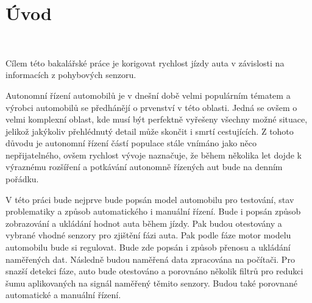 \chapter*{Úvod}
\label{sec:Introduction}
\

Cílem této bakalářské práce je korigovat rychlost jízdy auta v závislosti na informacích
z pohybových senzoru.

Autonomní řízení automobilů je v dnešní době velmi populárním tématem a výrobci automobilů
se předhánějí o prvenství v této oblasti. Jedná se ovšem o velmi komplexní oblast, kde
musí být perfektně vyřešeny všechny možné situace, jelikož jakýkoliv přehlédnutý detail může
skončit i smrtí cestujících. Z tohoto důvodu je autonomní řízení částí populace stále vnímáno jako něco 
nepřijatelného, ovšem rychlost vývoje naznačuje, že během několika let dojde k výraznému rozšíření a 
potkávání autonomně řízených aut bude na denním pořádku.

V této práci bude nejprve bude popsán model automobilu pro testování, stav problematiky a
způsob automatického i manuální řízení. Bude i popsán způsob zobrazování a ukládání hodnot auta během 
jízdy. Pak budou otestovány a vybrané vhodné senzory pro zjištění fázi auta.
Pak podle fáze motor modelu automobilu bude si regulovat.
Bude zde popsán i způsob přenosu a ukládání naměřených dat.
Následně budou naměřená data zpracována na počítači.
Pro snazší detekci fáze, auto bude otestováno a porovnáno několik filtrů
pro redukci šumu aplikovaných na signál naměřený těmito senzory.
Budou také porovnané automatické a manuální řízení.

\endinput
